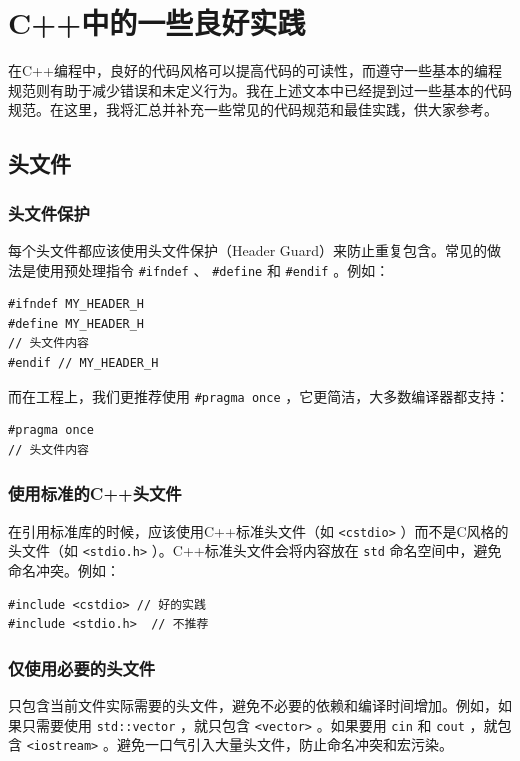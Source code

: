 \section{C++中的一些良好实践}

在C++编程中，良好的代码风格可以提高代码的可读性，而遵守一些基本的编程规范则有助于减少错误和未定义行为。我在上述文本中已经提到过一些基本的代码规范。在这里，我将汇总并补充一些常见的代码规范和最佳实践，供大家参考。

\subsection{头文件}

\subsubsection{头文件保护}

每个头文件都应该使用头文件保护（Header Guard）来防止重复包含。常见的做法是使用预处理指令 \texttt{\#ifndef} 、 \texttt{\#define} 和 \texttt{\#endif} 。例如：
\begin{verbatim}
#ifndef MY_HEADER_H
#define MY_HEADER_H
// 头文件内容
#endif // MY_HEADER_H
\end{verbatim}

而在工程上，我们更推荐使用 \texttt{\#pragma once} ，它更简洁，大多数编译器都支持：
\begin{verbatim}
#pragma once
// 头文件内容
\end{verbatim}

\subsubsection{使用标准的C++头文件}

在引用标准库的时候，应该使用C++标准头文件（如 \texttt{<cstdio>} ）而不是C风格的头文件（如 \texttt{<stdio.h>} ）。C++标准头文件会将内容放在 \texttt{std} 命名空间中，避免命名冲突。例如：
\begin{verbatim}
#include <cstdio> // 好的实践
#include <stdio.h>  // 不推荐
\end{verbatim}

\subsubsection{仅使用必要的头文件}

只包含当前文件实际需要的头文件，避免不必要的依赖和编译时间增加。例如，如果只需要使用 \texttt{std::vector} ，就只包含 \texttt{<vector>} 。如果要用 \texttt{cin} 和 \texttt{cout} ，就包含 \texttt{<iostream>} 。避免一口气引入大量头文件，防止命名冲突和宏污染。

